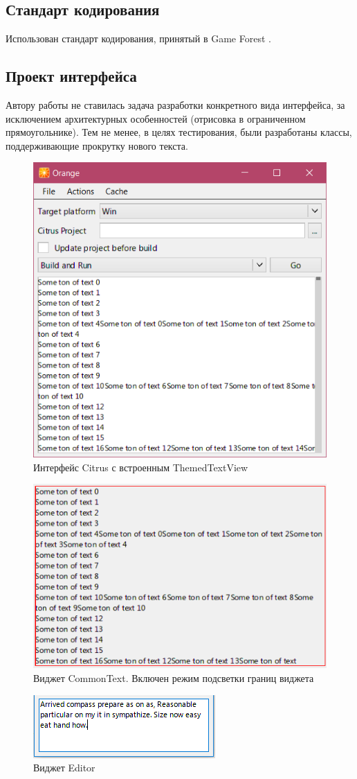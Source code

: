 \documentclass{fefu}
\begin{document}
		\subsection{Стандарт кодирования}
			Использован стандарт кодирования, принятый в Game Forest \cite{CodingConventions}.
		\subsection{Проект интерфейса}
			\par Автору работы не ставилась задача разработки конкретного вида интерфейса, за
			исключением архитектурных особенностей (отрисовка в ограниченном прямоугольнике).
			Тем не менее, в целях тестирования, были разработаны классы, поддерживающие 
			прокрутку нового текста.
			\begin{figure}[H]
				\centering
				\includegraphics[width=0.5\linewidth]{images/ScrollViewInt.png}
				\caption{Интерфейс Citrus с встроенным ThemedTextView}
			\end{figure}
			\begin{figure}[H]
				\centering
				\includegraphics[width=0.5\linewidth]{images/CommonTextInt.png}
				\caption{Виджет CommonText. Включен режим подсветки 
				границ виджета}
			\end{figure}
			\begin{figure}[H]
				\centering
				\includegraphics[width=0.5\linewidth]{images/EditBox.png}
				\caption{Виджет Editor}
			\end{figure}
\end{document}
